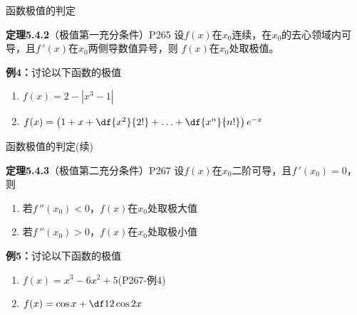 \begin{frame}{函数极值的判定}
	\linespread{1.2}\pause 
	\begin{block}{{\bf 定理5.4.2}（极值第一充分条件）\hfill P265}\pause 
		设$f(x)$在$x_0$连续，在$x_0$的去心领域内可导，且$f\,'(x)$在$x_0$两侧导数值异号，则
		$f(x)$在$x_0$处取极值。\pause 
	\end{block}
	\begin{exampleblock}{{\bf 例4：}讨论以下函数的极值\hfill }
		\begin{enumerate}
		  \item $f(x)=2-|x^3-1|$\pause
		  \item $f(x)=\left(1+x+\df{x^2}{2!}+\ldots+\df{x^n}{n!}\right)e^{-x}$ 
		\end{enumerate}
	\end{exampleblock}
\end{frame}

\begin{frame}{{函数极值的判定}{\small (续)}}
	\linespread{1.2}\pause 
	\begin{block}{{\bf 定理5.4.3}（极值第二充分条件）\hfill P267}\pause 
		设$f(x)$在$x_0$二阶可导，且$f\,'(x_0)=0$，则
		\begin{enumerate}\pause 
		  \item 若$f\,''(x_0)<0$，$f(x)$在$x_0$处取极大值\pause 
		  \item 若$f\,''(x_0)>0$，$f(x)$在$x_0$处取极小值
		\end{enumerate}
	\end{block}\pause 
	\begin{exampleblock}{{\bf 例5：}讨论以下函数的极值}
		\begin{enumerate}
		  \item $f(x)=x^3-6x^2+5$\hfill (P267-例4)\pause
		  \item $f(x)=\cos x+\df12\cos 2x$
		\end{enumerate}
	\end{exampleblock}
\end{frame}



